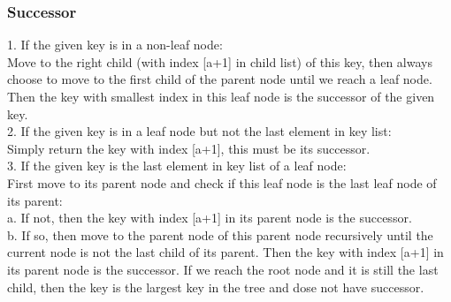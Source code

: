 \documentclass{article}
\begin{document}
\subsubsection*{Successor}
    1. If the given key is in a non-leaf node:\\
    Move to the right child (with index [a+1] in child list) of this key, then always choose to move 
to the first child of the parent node until we reach a leaf node. Then the key with smallest index in 
this leaf node is the successor of the given key.\\
    2. If the given key is in a leaf node but not the last element in key list:\\
    Simply return the key with index [a+1], this must be its successor.\\
    3. If the given key is the last element in key list of a leaf node:\\
    First move to its parent node and check if this leaf node is the last leaf node of its parent:\\
        a. If not, then the key with index [a+1] in its parent node is the successor.\\
        b. If so, then move to the parent node of this parent node recursively until the current node 
    is not the last child of its parent. Then the key with index [a+1] in its parent node is the successor. 
    If we reach the root node and it is still the last child, then the key is the largest key in the 
    tree and dose not have successor.
\end{document}
